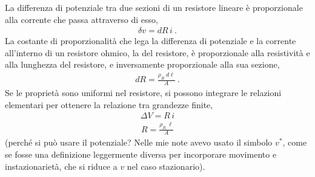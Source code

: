 \documentclass[letterpaper,10pt,italian]{jupyterBook}
\begin{document}
\sphinxAtStartPar
{} La differenza di potenziale tra due sezioni di un resistore lineare è proporzionale alla corrente che passa attraverso di esso,
\begin{equation*}
\begin{split}\delta v = dR \, i \ .\end{split}
\end{equation*}
\sphinxAtStartPar
{} La costante di proporzionalità che lega la differenza di potenziale e la corrente all’interno di un resistore ohmico, la  del resistore, è proporzionale alla resistività e alla lunghezza del resistore, e inversamente proporzionale alla sua sezione,
\begin{equation*}
\begin{split}dR = \frac{\rho_R \ d\ell}{A} \ .\end{split}
\end{equation*}
\sphinxAtStartPar
Se le proprietà sono uniformi nel resistore, si possono integrare le relazioni elementari per ottenere la relazione tra grandezze finite,
\begin{equation*}
\begin{split}\Delta V = R \, i \end{split}
\end{equation*}\begin{equation*}
\begin{split}R = \frac{\rho_R \ \ell}{A}\end{split}
\end{equation*}
\sphinxAtStartPar
{} (perché si può usare il potenziale? Nelle mie note avevo usato il simbolo \(v^*\), come se fosse una definizione leggermente diversa per incorporare movimento e instazionarietà, che si riduce a \(v\) nel caso stazionario).

\sphinxAtStartPar
{}

\sphinxAtStartPar
{}

\sphinxAtStartPar
{}

\sphinxAtStartPar
{}

\sphinxstepscope
\end{document}
